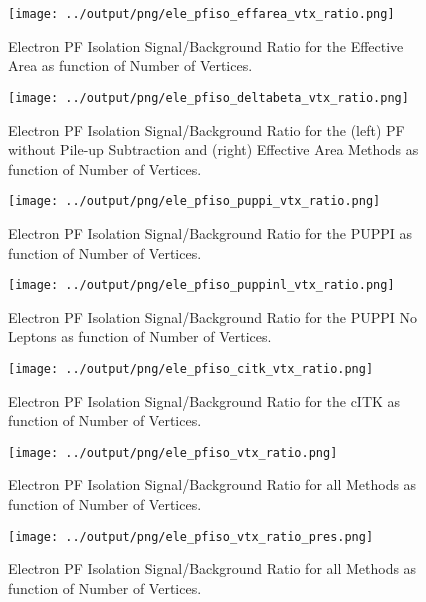 \documentclass[11pt]{book}
\begin{document}
\begin{figure}[htb]
\centering
\texttt{[image: ../output/png/ele\_pfiso\_effarea\_vtx\_ratio.png]}
\caption{Electron PF Isolation Signal/Background Ratio for the Effective Area as function of Number of Vertices.}
\label{fig:ele_pfiso_vtx_ratio_effarea}
\end{figure}

\begin{figure}[htb]
\centering
\texttt{[image: ../output/png/ele\_pfiso\_deltabeta\_vtx\_ratio.png]}
\caption{Electron PF Isolation Signal/Background Ratio for the (left) PF without Pile-up Subtraction and (right) Effective Area Methods as function of Number of Vertices.}
\label{fig:ele_pfiso_vtx_ratio_deltabeta}
\end{figure}

\begin{figure}[htb]
\centering
\texttt{[image: ../output/png/ele\_pfiso\_puppi\_vtx\_ratio.png]}
\caption{Electron PF Isolation Signal/Background Ratio for the PUPPI as function of Number of Vertices.}
\label{fig:ele_pfiso_vtx_ratio_puppi}
\end{figure}

\begin{figure}[htb]
\centering
\texttt{[image: ../output/png/ele\_pfiso\_puppinl\_vtx\_ratio.png]}
\caption{Electron PF Isolation Signal/Background Ratio for the PUPPI No Leptons as function of Number of Vertices.}
\label{fig:ele_pfiso_vtx_ratio_puppinl}
\end{figure}

\begin{figure}[htb]
\centering
\texttt{[image: ../output/png/ele\_pfiso\_citk\_vtx\_ratio.png]}
\caption{Electron PF Isolation Signal/Background Ratio for the cITK as function of Number of Vertices.}
\label{fig:ele_pfiso_vtx_ratio_citk}
\end{figure}

\begin{figure}[htb]
\centering
\texttt{[image: ../output/png/ele\_pfiso\_vtx\_ratio.png]}
\caption{Electron PF Isolation Signal/Background Ratio for all Methods as function of Number of Vertices.}
\label{fig:ele_pfiso_vtx_ratio}
\end{figure}

\begin{figure}[htb]
\centering
\texttt{[image: ../output/png/ele\_pfiso\_vtx\_ratio\_pres.png]}
\caption{Electron PF Isolation Signal/Background Ratio for all Methods as function of Number of Vertices.}
\label{fig:ele_pfiso_vtx_ratio_pres}
\end{figure}
\clearpage


\end{document}
